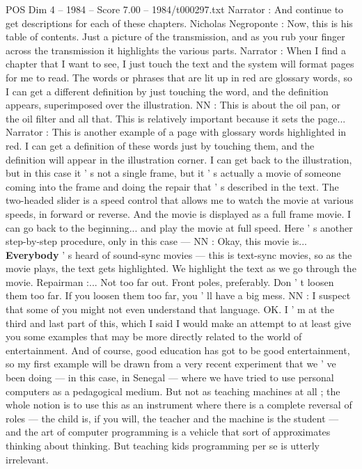 \begin{textsample}{POS Dim 4 – 1984 – Score 7.00 – 1984/t000297.txt}
Narrator : And continue to get descriptions for each of these chapters.
Nicholas Negroponte : Now, this is his table of contents.
Just a picture of the transmission, and as you rub your finger across the transmission it highlights the various parts.
Narrator : When I find a chapter that I want to see, I just touch the text and the system will format pages for me to read.
The words or phrases that are lit up in red are glossary words, so I can get a different definition by just touching the word, and the definition appears, superimposed over the illustration.
NN : This is about the oil pan, or the oil filter and all that.
This is relatively important because it sets the page...
Narrator : This is another example of a page with glossary words highlighted in red.
I can get a definition of these words just by touching them, and the definition will appear in the illustration corner.
I can get back to the illustration, but in this case it ' s not a single frame, but it ' s actually a movie of someone coming into the frame and doing the repair that ' s described in the text.
The two-headed slider is a speed control that allows me to watch the movie at various speeds, in forward or reverse.
And the movie is displayed as a full frame movie.
I can go back to the beginning... and play the movie at full speed.
Here ' s another step-by-step procedure, only in this case — NN : Okay, this movie is... \textbf{Everybody} ' s heard of sound-sync movies — this is text-sync movies, so as the movie plays, the text gets highlighted.
We highlight the text as we go through the movie.
Repairman :...
Not too far out.
Front poles, preferably.
Don ' t loosen them too far.
If you loosen them too far, you ' ll have a big mess.
NN : I suspect that some of you might not even understand that language.
OK.
I ' m at the third and last part of this, which I said I would make an attempt to at least give you some examples that may be more directly related to the world of entertainment.
And of course, good education has got to be good entertainment, so my first example will be drawn from a very recent experiment that we ' ve been doing — in this case, in Senegal — where we have tried to use personal computers as a pedagogical medium.
But not as teaching machines at all ; the whole notion is to use this as an instrument where there is a complete reversal of roles — the child is, if you will, the teacher and the machine is the student — and the art of computer programming is a vehicle that sort of approximates thinking about thinking.
But teaching kids programming per se is utterly irrelevant.

\end{textsample}
